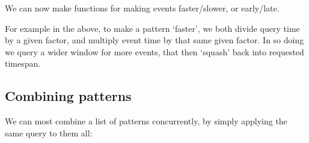 We can now make functions for making events faster/slower, or
early/late.

\begin{Shaded}
\begin{Highlighting}[]
  \OtherTok{{-}\textgreater{}} \OtherTok{{-}\textgreater{}} 
\OtherTok{=}\OperatorTok{/}\OperatorTok{*}
\OtherTok{=}\OperatorTok{*}\OperatorTok{/}
\OtherTok{=}\OperatorTok{+}
\OtherTok{=}\OperatorTok{+}
\end{Highlighting}
\end{Shaded}

For example in the above, to make a pattern `faster', we both divide
query time by a given factor, and multiply event time by that same given
factor. In so doing we query a wider window for more events, that then
`squash' back into requested timespan.

\subsection{Combining patterns}\label{combining-patterns}

We can most combine a list of patterns concurrently, by simply applying
the same query to them all:

\begin{Shaded}
\begin{Highlighting}[]
\NormalTok{ [}\NormalTok{ a] }\OtherTok{{-}\textgreater{}} 
\OtherTok{=}  \OperatorTok{$}\OtherTok{{-}\textgreater{}} \NormalTok{ (}
\end{Highlighting}
\end{Shaded}

